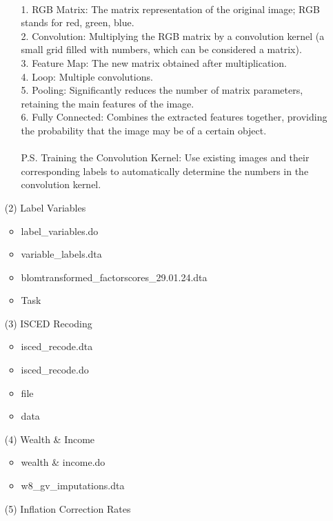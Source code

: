 \documentclass[12pt]{article}
\begin{document}
\begin{itemize}
\begin{itemize}
        \\
        1. RGB Matrix: The matrix representation of the original image; RGB stands for red, green, blue. \\
        2. Convolution: Multiplying the RGB matrix by a convolution kernel (a small grid filled with numbers, which can be considered a matrix). \\
        3. Feature Map: The new matrix obtained after multiplication. \\
        4. Loop: Multiple convolutions. \\
        5. Pooling: Significantly reduces the number of matrix parameters, retaining the main features of the image. \\
        6. Fully Connected: Combines the extracted features together, providing the probability that the image may be of a certain object. \\
        \\
        P.S. Training the Convolution Kernel: Use existing images and their corresponding labels to automatically determine the numbers in the convolution kernel.
    \end{itemize}
    \item[(2)] Label Variables
    \begin{itemize}
        \item label\_variables.do
        \item variable\_labels.dta
        \item blomtransformed\_factorscores\_29.01.24.dta
        \item Task
    \end{itemize}
    \item[(3)] ISCED Recoding
    \begin{itemize}
        \item isced\_recode.dta
        \item isced\_recode.do
        \item file
        \item data
    \end{itemize}
    \item[(4)] Wealth \& Income
    \begin{itemize}
        \item wealth \& income.do 
        \item w8\_gv\_imputations.dta
    \end{itemize}
    \item[(5)] Inflation Correction Rates
    \begin{itemize}

\end{itemize}
\end{itemize}
\end{document}
